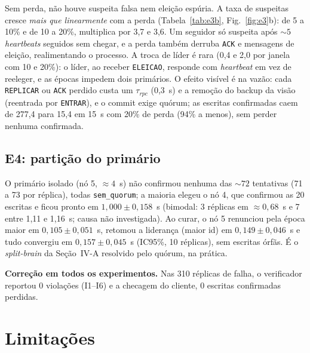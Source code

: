 \documentclass[conference,a4paper]{IEEEtran}
\begin{document}
Sem perda, não houve suspeita falsa nem eleição espúria. A taxa de suspeitas
cresce \emph{mais que linearmente} com a perda (Tabela~\ref{tab:e3b},
Fig.~\ref{fig:e3}b): de 5 a 10\% e de 10 a 20\%, multiplica por 3,7 e 3,6. Um
seguidor só suspeita após ${\sim}5$ \emph{heartbeats} seguidos sem chegar, e a
perda também derruba \texttt{ACK} e mensagens de eleição, realimentando o
processo. A troca de líder é rara (0,4 e 2,0 por janela com 10 e 20\%): o líder, ao receber \texttt{ELEICAO}, responde com
\emph{heartbeat} em vez de reeleger, e as épocas impedem dois primários. O
efeito visível é na vazão: cada \texttt{REPLICAR} ou \texttt{ACK} perdido custa
um $\tau_{rpc}$ (0,3~s) e a remoção do backup da visão (reentrada por
\texttt{ENTRAR}), e o commit exige quórum; as escritas confirmadas caem de
277,4 para 15,4 em 15~s com 20\% de perda (94\% a menos), sem perder nenhuma
confirmada.

\subsection{E4: partição do primário}

O primário isolado (nó 5, ${\approx}4$~s) não confirmou nenhuma das
${\sim}72$ tentativas (71 a 73 por réplica), todas \texttt{sem\_quorum}; a
maioria elegeu o nó 4, que confirmou as 20 escritas e ficou pronto em
$1{,}000\pm0{,}158$~s (bimodal: 3 réplicas em ${\approx}0{,}68$~s e 7 entre 1,11
e 1,16~s; causa não investigada). Ao curar, o nó 5 renunciou pela época maior em
$0{,}105\pm0{,}051$~s, retomou a liderança (maior id) em $0{,}149\pm0{,}046$~s e
tudo convergiu em $0{,}157\pm0{,}045$~s (IC95\%, 10 réplicas), sem escritas
órfãs. É o \emph{split-brain} da Seção~IV-A resolvido pelo quórum, na prática.

\textbf{Correção em todos os experimentos.} Nas 310 réplicas de falha, o
verificador reportou 0 violações (I1--I6) e a checagem do cliente, 0 escritas
confirmadas perdidas.

\FloatBarrier

\section{Limitações}
\end{document}
